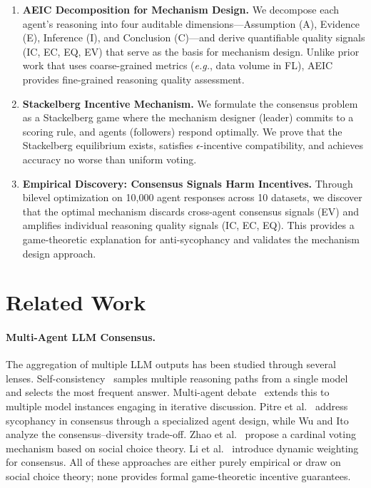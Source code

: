 \documentclass[runningheads]{llncs}
\newcommand{\eg}{\textit{e.g.}}
\begin{document}
\begin{enumerate}
    \item \textbf{AEIC Decomposition for Mechanism Design.} We decompose each agent's reasoning into four auditable dimensions---Assumption (A), Evidence (E), Inference (I), and Conclusion (C)---and derive quantifiable quality signals (IC, EC, EQ, EV) that serve as the basis for mechanism design. Unlike prior work that uses coarse-grained metrics (\eg, data volume in FL), AEIC provides fine-grained reasoning quality assessment.

    \item \textbf{Stackelberg Incentive Mechanism.} We formulate the consensus problem as a Stackelberg game where the mechanism designer (leader) commits to a scoring rule, and agents (followers) respond optimally. We prove that the Stackelberg equilibrium exists, satisfies $\epsilon$-incentive compatibility, and achieves accuracy no worse than uniform voting.

    \item \textbf{Empirical Discovery: Consensus Signals Harm Incentives.} Through bilevel optimization on 10{,}000 agent responses across 10 datasets, we discover that the optimal mechanism discards cross-agent consensus signals (EV) and amplifies individual reasoning quality signals (IC, EC, EQ). This provides a game-theoretic explanation for anti-sycophancy and validates the mechanism design approach.
\end{enumerate}

\section{Related Work}
\label{sec:related}

\paragraph{Multi-Agent LLM Consensus.}
The aggregation of multiple LLM outputs has been studied through several lenses. Self-consistency~\cite{wang2023selfconsistency} samples multiple reasoning paths from a single model and selects the most frequent answer. Multi-agent debate~\cite{du2024improving,choi2025debate} extends this to multiple model instances engaging in iterative discussion. Pitre et al.~\cite{pitre2025consensagent} address sycophancy in consensus through a specialized agent design, while Wu and Ito~\cite{wu2025disagreement} analyze the consensus--diversity trade-off. Zhao et al.~\cite{zhao2024electoral} propose a cardinal voting mechanism based on social choice theory. Li et al.~\cite{li2025dynamic} introduce dynamic weighting for consensus. All of these approaches are either purely empirical or draw on social choice theory; none provides formal game-theoretic incentive guarantees.
\end{document}
